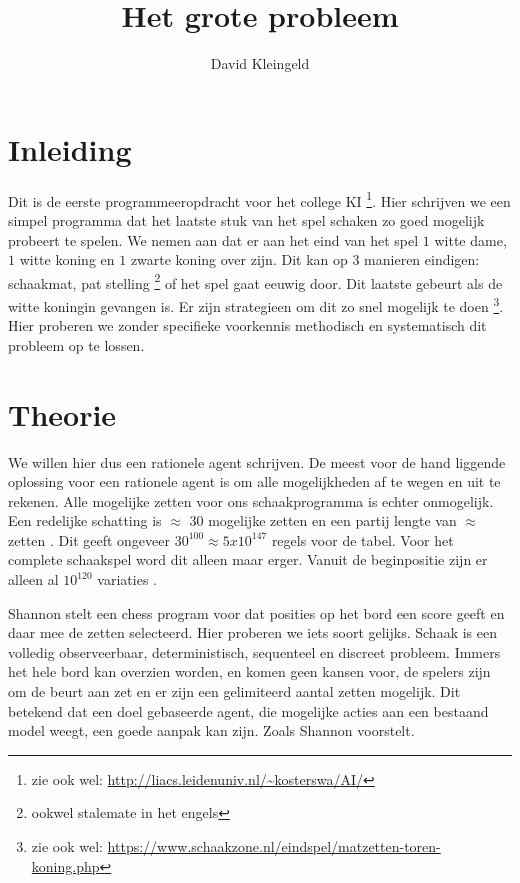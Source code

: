 \documentclass[10pt]{article}
\author{David Kleingeld}
\title{Het grote probleem}
\begin{document}

\maketitle

\section{Inleiding}

Dit is de eerste programmeeropdracht voor het college KI \footnote{zie ook wel: \url{http://liacs.leidenuniv.nl/~kosterswa/AI/}}. Hier schrijven we een simpel programma dat het laatste stuk van het spel schaken zo goed mogelijk probeert te spelen. We nemen aan dat er aan het eind van het spel $1$ witte dame, $1$ witte koning en $1$ zwarte koning over zijn. Dit kan op 3 manieren eindigen: schaakmat, pat stelling \footnote{ookwel stalemate in het engels} of het spel gaat eeuwig door. Dit laatste gebeurt als de witte koningin gevangen is. Er zijn strategieen om dit zo snel mogelijk te doen \footnote{zie ook wel: \url{https://www.schaakzone.nl/eindspel/matzetten-toren-koning.php}}. Hier proberen we zonder specifieke voorkennis methodisch en systematisch dit probleem op te lossen.

\section{Theorie}

We willen hier dus een rationele agent schrijven. De meest voor de hand liggende oplossing voor een rationele agent is om alle mogelijkheden af te wegen en uit te rekenen. Alle mogelijke zetten voor ons schaakprogramma is echter onmogelijk. Een redelijke schatting is $\approx$ 30 \cite{Shannon:1988} mogelijke zetten en een partij lengte van $\approx$ zetten \cite{kosters:lecture2:sheet9}. Dit geeft ongeveer $30^{100} \approx 5x10^{147}$ regels voor de tabel. Voor het complete schaakspel word dit alleen maar erger. Vanuit de beginpositie zijn er alleen al $10^{120}$ variaties \cite{Shannon:1988}.

Shannon stelt een chess program voor dat posities op het bord een score geeft en daar mee de zetten selecteerd. Hier proberen we iets soort gelijks. Schaak is een volledig observeerbaar, deterministisch, sequenteel en discreet probleem. Immers het hele bord kan overzien worden, en komen geen kansen voor, de spelers zijn om de beurt aan zet en er zijn een gelimiteerd aantal zetten mogelijk. Dit betekend dat een doel gebaseerde agent, die mogelijke acties aan een bestaand model weegt, een goede aanpak kan zijn. Zoals Shannon voorstelt.
\end{document}
